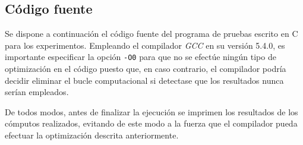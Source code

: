 \documentclass[conference]{IEEEtran}
\begin{document}
\subsection{Código fuente}
Se dispone a continuación el código fuente del programa de pruebas escrito en C para los experimentos. Empleando el compilador \textit{GCC} en su versión 5.4.0, es importante especificar la opción \texttt{-O0} para que no se efectúe ningún tipo de optimización en el código puesto que, en caso contrario, el compilador podría decidir eliminar el bucle computacional si detectase que los resultados nunca serían empleados.

De todos modos, antes de finalizar la ejecución se imprimen los resultados de los cómputos realizados, evitando de este modo a la fuerza que el compilador pueda efectuar la optimización descrita anteriormente.
\end{document}

